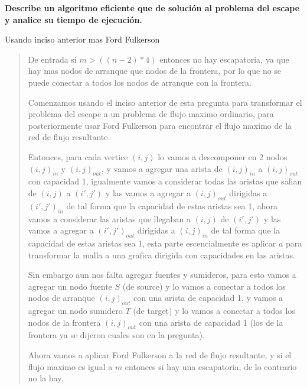 \textbf{
    Describe un algoritmo eficiente que de solución al problema del escape y analice su tiempo de ejecución.
}\vspace{.2cm}

\textcolor{bibi}{Usando inciso anterior mas Ford Fulkerson}
\begin{quote}
    De entrada si $m > ((n-2)*4)$ entonces no hay escapatoria, ya que hay mas nodos de arranque que nodos de la frontera, por lo que no se puede conectar a todos los nodos de arranque con la frontera. \vspace{.2cm}

    Comenzamos usando el inciso anterior de esta pregunta para transformar el problema del escape a un problema de flujo maximo ordinario, para posteriormente usar Ford Fulkerson para encontrar el flujo maximo de la red de flujo resultante. \vspace{.2cm}

    Entonces, para cada vertice $(i,j)$ lo vamos a descomponer en 2 nodos $(i,j)_{in}$ y $(i,j)_{out}$, y vamos a agregar una arista de $(i,j)_{in}$ a $(i,j)_{out}$ con capacidad 1, igualmente vamos a considerar todas las aristas que salian de $(i,j)$ a $(i',j')$ y las vamos a agregar a $(i,j)_{out}$ dirigidas a $(i',j')_{in}$ de tal forma que la capacidad de estas aristas sea 1, ahora vamos a considerar las aristas que llegaban a $(i,j)$ de $(i',j')$ y las vamos a agregar a $(i',j')_{out}$ dirigidas a $(i,j)_{in}$ de tal forma que la capacidad de estas aristas sea 1, esta parte escencialmente es aplicar $a$ para transformar la malla a una grafica dirigida con capacidades en las aristas. \vspace{.2cm}

    Sin embargo aun nos falta agregar fuentes y sumideros, para esto vamos a agregar un nodo fuente $S$ (de source) y lo vamos a conectar a todos los nodos de arranque $(i,j)_{out}$ con una arista de capacidad 1, y vamos a agregar un nodo sumidero $T$ (de target) y lo vamos a conectar a todos los nodos de la frontera $(i,j)_{out}$ con una arista de capacidad 1 (los de la frontera ya se dijeron cuales son en la pregunta). \vspace{.2cm}

    Ahora vamos a aplicar Ford Fulkerson a la red de flujo resultante, y si el flujo maximo es igual a $m$ entonces si hay una escapatoria, de lo contrario no la hay. \vspace{.2cm}


\end{quote}
